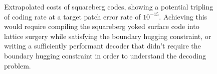 \documentclass[onecolumn,unpublished,a4paper]{quantumarticle}
\theoremstyle{definition}
\theoremstyle{definition}
\theoremstyle{definition}
\begin{document}
\begin{figure}[h]
    \centering
    \caption{
        Extrapolated costs of squareberg codes, showing a potential tripling of coding rate at a target patch error rate of $10^{-15}$.
        Achieving this would require compiling the squareberg yoked surface code into lattice surgery while satisfying the boundary hugging constraint, or writing a sufficiently performant decoder that didn't require the boundary hugging constraint in order to understand the decoding problem.
    }
    \label{fig:squareberg_potential}
\end{figure}
\end{document}

